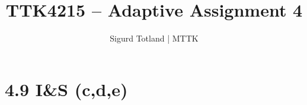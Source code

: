 \documentclass[]{article}
\title{TTK4215 – Adaptive Assignment 4}
\author{Sigurd Totland | MTTK}
\begin{document}
\maketitle

\section{4.9 I\&S (c,d,e)}
\setcounter{subsection}{2}
\subsection{}
\end{document}
